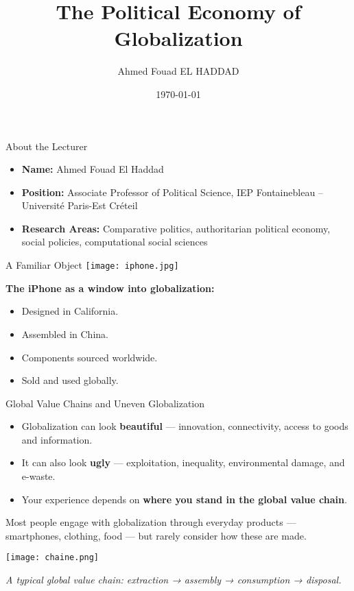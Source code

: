\documentclass{beamer}
\title{The Political Economy of Globalization}
\author{Ahmed Fouad EL HADDAD}
\institute{UPEC -- IEP Fontainebleau}
\date{\today}
\begin{document}
\begin{frame}
    \titlepage
\end{frame}

\begin{frame}{About the Lecturer}
\centering
\begin{itemize}
    \item \textbf{Name:} Ahmed Fouad El Haddad  
    \item \textbf{Position:} Associate Professor of Political Science, IEP Fontainebleau – Université Paris-Est Créteil  
    \item \textbf{Research Areas:} Comparative politics, authoritarian political economy, social policies, computational social sciences  
\end{itemize}
\end{frame}

\begin{frame}{A Familiar Object}
\centering
\texttt{[image: iphone.jpg]}

\vspace{0.3cm}
\textbf{The iPhone as a window into globalization:}
\begin{itemize}
    \item Designed in California.
    \item Assembled in China.
    \item Components sourced worldwide.
    \item Sold and used globally.
\end{itemize}
\end{frame}

\begin{frame}{Global Value Chains and Uneven Globalization}

\small

\begin{itemize}
    \item Globalization can look \textbf{beautiful} — innovation, connectivity, access to goods and information.
    \item It can also look \textbf{ugly} — exploitation, inequality, environmental damage, and e-waste.
    \item Your experience depends on \textbf{where you stand in the global value chain}.
\end{itemize}

\vspace{0.5em}
Most people engage with globalization through everyday products — smartphones, clothing, food —  
but rarely consider how these are made.

\vspace{1em}
\centering
\texttt{[image: chaine.png]}

\vspace{0.3em}
\scriptsize \textit{A typical global value chain: extraction → assembly → consumption → disposal.}

\end{frame}
\end{document}
